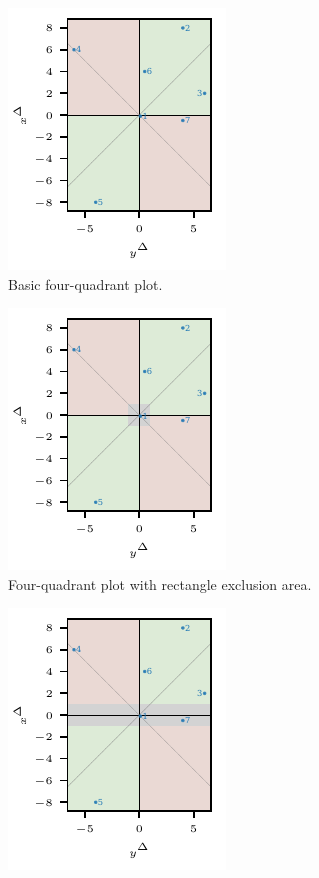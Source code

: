 \begin{figure}
\centering
\begin{subfigure}[t]{.24\textwidth}
\includegraphics{plots/illustrative_examples/4Q_without_excl}
\caption{Basic four-quadrant plot.} \label{fig:trending_basic_4q}
\end{subfigure}\hspace{0.01\textwidth}%
\begin{subfigure}[t]{.24\textwidth}
\includegraphics{plots/illustrative_examples/4q_excl_box}
\caption{Four-quadrant plot with rectangle exclusion area.}\label{fig:trending_basic_4q_excl_box}
\end{subfigure}\hspace{0.01\textwidth}%
\begin{subfigure}[t]{.24\textwidth}
\includegraphics{plots/illustrative_examples/4q_excl_axis}

\end{subfigure}
\end{figure}
